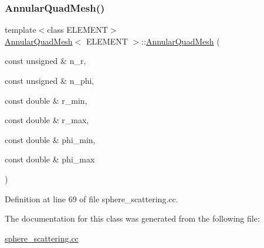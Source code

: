 \subsubsection{\texorpdfstring{Annular\+Quad\+Mesh()}{AnnularQuadMesh()}}
{\footnotesize\ttfamily template$<$class E\+L\+E\+M\+E\+NT$>$ \\
\hyperlink{classAnnularQuadMesh}{Annular\+Quad\+Mesh}$<$ E\+L\+E\+M\+E\+NT $>$\+::\hyperlink{classAnnularQuadMesh}{Annular\+Quad\+Mesh} (\begin{DoxyParamCaption}\item[{const unsigned \&}]{n\+\_\+r,  }\item[{const unsigned \&}]{n\+\_\+phi,  }\item[{const double \&}]{r\+\_\+min,  }\item[{const double \&}]{r\+\_\+max,  }\item[{const double \&}]{phi\+\_\+min,  }\item[{const double \&}]{phi\+\_\+max }\end{DoxyParamCaption})\hspace{0.3cm}{\ttfamily [inline]}}



Definition at line 69 of file sphere\+\_\+scattering.\+cc.



The documentation for this class was generated from the following file\+:\begin{DoxyCompactItemize}
\item 
\hyperlink{sphere__scattering_8cc}{sphere\+\_\+scattering.\+cc}\end{DoxyCompactItemize}
